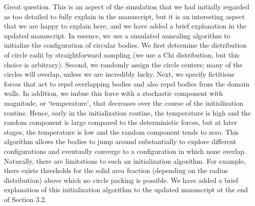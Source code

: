 \documentclass[11pt]{article}
\begin{document}
Great question. This is an aspect of the simulation that we had initially regarded as too detailed to fully explain in the manuscript, but it is an interesting aspect that we are happy to explain here, and we have added a brief explanation in the updated manuscript. In essence, we use a simulated annealing algorithm to initialize the configuration of circular bodies. We first determine the distribution of circle radii by straightforward sampling (we use a Chi distribution, but this choice is arbitrary). Second, we randomly assign the circle centers; many of the circles will overlap, unless we are incredibly lucky. Next, we specify fictitious forces that act to repel overlapping bodies and also repel bodies from the domain walls. In addition, we imbue this force with a stochastic component with magnitude, or `temperature', that decreases over the course of the initialization routine. Hence, early in the initialization routine, the temperature is high and the random component is large compared to the deterministic forces, but at later stages, the temperature is low and the random component tends to zero. This algorithm allows the bodies to jump around substantially to explore different configurations and eventually converge to a configuration in which none overlap. Naturally, there are limitations to such an initialization algorithm. For example, there exists thresholds for the solid area fraction (depending on the radius distribution) above which no circle packing is possible.
We have added a brief explanation of this initialization algorithm to the updated manuscript at the end of Section 3.2.
\end{document}
